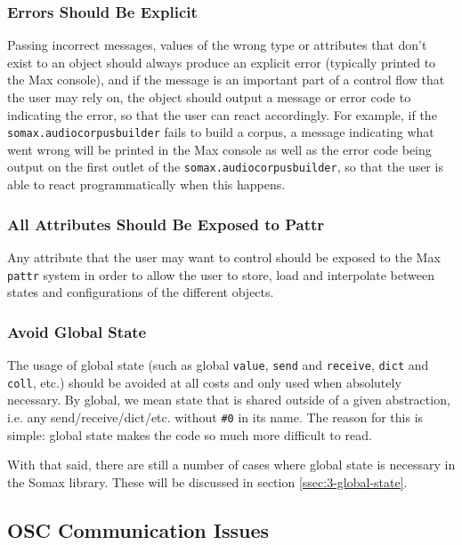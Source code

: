 \subsubsection{Errors Should Be Explicit}
Passing incorrect messages, values of the wrong type or attributes that don't exist to an object should always produce an explicit error (typically printed to the Max console), and if the message is an important part of a control flow that the user may rely on, the object should output a message or error code to indicating the error, so that the user can react accordingly. For example, if the \texttt{somax.audiocorpusbuilder} fails to build a corpus, a message indicating what went wrong will be printed in the Max console as well as the error code being output on the first outlet of the \texttt{somax.audiocorpusbuilder}, so that the user is able to react programmatically when this happens.


\subsubsection{All Attributes Should Be Exposed to Pattr}
Any attribute that the user may want to control should be exposed to the Max \texttt{pattr} system in order to allow the user to store, load and interpolate between states and configurations of the different objects.

\subsubsection{Avoid Global State}
The usage of global state (such as global \texttt{value}, \texttt{send} and \texttt{receive}, \texttt{dict} and \texttt{coll}, etc.) should be avoided at all costs and only used when absolutely necessary. By global, we mean state that is shared outside of a given abstraction, i.e. any send/receive/dict/etc. without \texttt{\#0} in its name. The reason for this is simple: global state makes the code so much more difficult to read. 

With that said, there are still a number of cases where global state is necessary in the Somax library. These will be discussed in section \ref{ssec:3-global-state}.


\subsection{OSC Communication Issues}\label{ssec:3-osc-issues}


